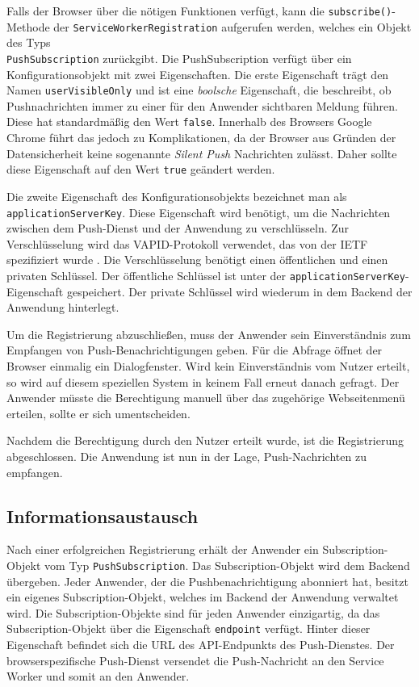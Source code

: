 Falls der Browser über die nötigen Funktionen verfügt, kann die \texttt{subscribe()}-Methode der \texttt{ServiceWorkerRegistration} aufgerufen werden,
welches ein Objekt des Typs \\ \texttt{PushSubscription} zurückgibt. 
Die PushSubscription verfügt über ein Konfigurationsobjekt mit zwei Eigenschaften. Die erste Eigenschaft trägt den Namen \texttt{userVisibleOnly} und ist eine \textit{boolsche} Eigenschaft, die  beschreibt, ob Pushnachrichten immer zu einer für den Anwender sichtbaren Meldung führen. Diese hat standardmäßig den Wert \texttt{false}. Innerhalb des Browsers Google Chrome führt das jedoch zu Komplikationen, da der Browser aus Gründen der Datensicherheit keine sogenannte \textit{Silent Push} Nachrichten zulässt. Daher sollte diese Eigenschaft auf den Wert \texttt{true} geändert werden. 

Die zweite Eigenschaft des Konfigurationsobjekts bezeichnet man als\\ \texttt{applicationServerKey}. Diese Eigenschaft wird benötigt, um die Nachrichten zwischen dem Push-Dienst und der Anwendung zu verschlüsseln. Zur Verschlüsselung wird das \ac{VAPID}-Protokoll verwendet, das von der IETF spezifiziert wurde \cite{rfc8292}. Die Verschlüsselung benötigt einen öffentlichen und einen privaten Schlüssel. Der öffentliche Schlüssel ist unter der \texttt{applicationServerKey}-Eigenschaft gespeichert. Der private Schlüssel wird wiederum in dem Backend der Anwendung hinterlegt. 

Um die Registrierung abzuschließen, muss der Anwender sein Einverständnis zum Empfangen von Push-Benachrichtigungen geben. Für die Abfrage öffnet der Browser einmalig ein Dialogfenster. Wird kein Einverständnis vom Nutzer erteilt, so wird auf diesem speziellen System in keinem Fall erneut danach gefragt. Der Anwender müsste die Berechtigung manuell über das zugehörige Webseitenmenü erteilen, sollte er sich umentscheiden. 

Nachdem die Berechtigung durch den Nutzer erteilt wurde, ist die Registrierung abgeschlossen. Die Anwendung ist nun in der Lage, Push-Nachrichten zu empfangen. 

\subsection{Informationsaustausch}

Nach einer erfolgreichen Registrierung erhält der Anwender ein Subscription-Objekt vom Typ \texttt{PushSubscription}.
Das Subscription-Objekt wird dem Backend übergeben. Jeder Anwender, der die Pushbenachrichtigung abonniert hat, besitzt ein eigenes Subscription-Objekt, welches im Backend der Anwendung verwaltet wird. 
Die Subscription-Objekte sind für jeden Anwender einzigartig, da das Subscription-Objekt über die Eigenschaft \texttt{endpoint} verfügt. Hinter dieser Eigenschaft befindet sich die URL des API-Endpunkts des Push-Dienstes. Der browserspezifische Push-Dienst versendet die Push-Nachricht an den Service Worker und somit an den Anwender. 

